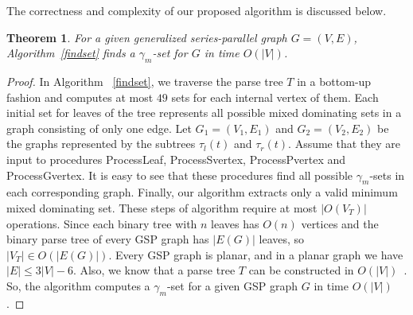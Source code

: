 \documentclass[12pt]{article}
\newtheorem{theorem}{Theorem}[section]
\theoremstyle{definition}
\theoremstyle{remark}
\begin{document}
The correctness and complexity of our proposed algorithm is discussed below.


\begin{theorem}\label{Complexity}
	For a given generalized series-parallel graph $G=(V,E)$, Algorithm~\ref{findset} finds a $\gamma_m$-set for $G$ in time $O(\vert V \vert)$.
	\end{theorem}	

\begin{proof}
In Algorithm ~\ref{findset}, we traverse the parse tree $T$ in a bottom-up fashion and computes at most $49$ sets for each internal vertex of them.
 Each initial set for leaves of the tree represents all possible mixed dominating sets in a graph consisting of only one edge. 
 Let $G_1 = (V_1, E_1)$ and $G_2=(V_2, E_2)$ be the graphs represented by the subtrees
$\tau_l(t)$ and $\tau_r(t)$. Assume that they are input to procedures ProcessLeaf,
ProcessSvertex,   ProcessPvertex and ProcessGvertex. It is easy to see that these
procedures   find all possible $\gamma_m$-sets in each corresponding graph. Finally,
our algorithm extracts only a valid minimum mixed dominating set. These steps of
algorithm require at most $\vert O(V_T) \vert$ operations. Since each binary tree with
$n$ leaves has $O(n)$ vertices and the binary parse tree of every GSP graph  has
$\vert E(G) \vert$ leaves, so $\vert V_T\vert \in O(\vert E (G)\vert)$. Every GSP
graph is planar, and in a planar graph we have $\vert E \vert \leq 3 \vert V \vert -
6$. Also, we know that a parse tree $T$ can be constructed in $O(\vert V \vert)$~\cite{kikuno1983linear}. So, the algorithm  computes a $\gamma_{m}$-set for a given GSP graph $G$ in time $O(\vert V \vert)$.
\end{proof}
\end{document}
